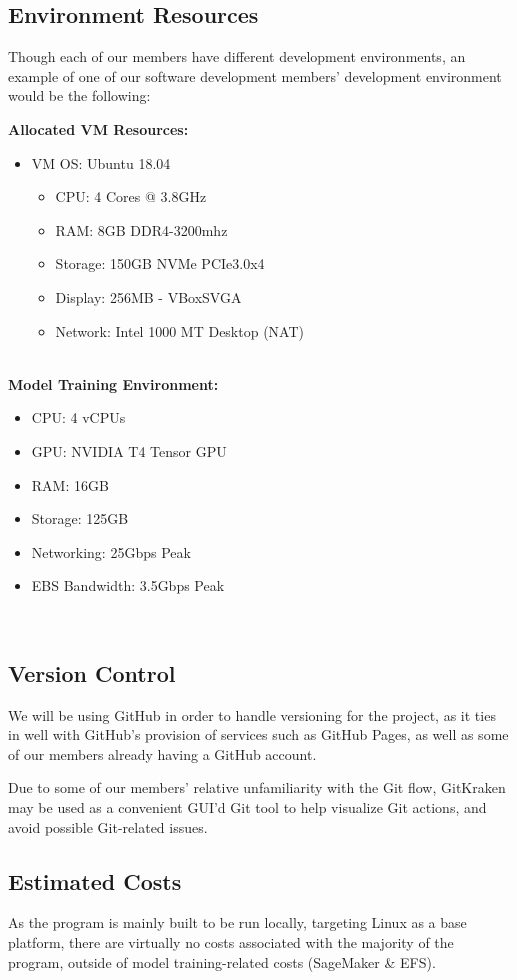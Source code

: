 \documentclass[conference]{IEEEtran}
\begin{document}
\subsection{Environment Resources}
Though each of our members have different development environments, an example of one of our software development members' development environment would be the following:

\textbf{Allocated VM Resources:}
\begin{itemize}
\item VM OS: Ubuntu 18.04
\begin{itemize}
\item CPU: 4 Cores @ 3.8GHz
\item RAM: 8GB DDR4-3200mhz
\item Storage: 150GB NVMe PCIe3.0x4
\item Display: 256MB - VBoxSVGA
\item Network: Intel 1000 MT Desktop (NAT)
\end{itemize}
\end{itemize}~\\

\textbf{Model Training Environment:}
\begin{itemize}
\item CPU: 4 vCPUs
\item GPU: NVIDIA T4 Tensor GPU
\item RAM: 16GB
\item Storage: 125GB
\item Networking: 25Gbps Peak
\item EBS Bandwidth: 3.5Gbps Peak
\end{itemize}~\\

\subsection{Version Control}
We will be using GitHub in order to handle versioning for the project, as it ties in well with GitHub's provision of services such as GitHub Pages, as well as some of our members already having a GitHub account.

Due to some of our members' relative unfamiliarity with the Git flow, GitKraken may be used as a convenient GUI'd Git tool to help visualize Git actions, and avoid possible Git-related issues.
\newline

\subsection{Estimated Costs}
As the program is mainly built to be run locally, targeting Linux as a base platform, there are virtually no costs associated with the majority of the program, outside of model training-related costs (SageMaker \& EFS).~\\
\end{document}
